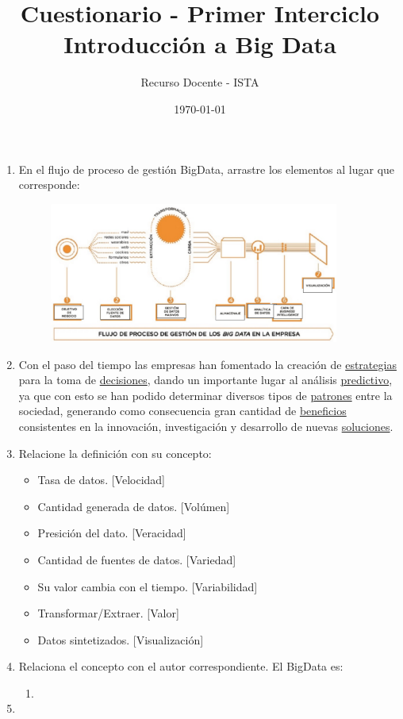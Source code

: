 \documentclass{article}
\title{Cuestionario - Primer Interciclo\\Introducción a Big Data}
\author{Recurso Docente - ISTA}
\date{\today}
\begin{document}
    \maketitle

    \begin{enumerate}
        \item En el flujo de proceso de gestión BigData, arrastre los elementos al lugar que corresponde:
            \begin{figure}[!h]
                \centering
                \includegraphics[width=0.9\textwidth]{img/recurso-1.png} 
            \end{figure}
        
        \item Con el paso del tiempo las empresas han fomentado la creación de \underline{estrategias} para la toma de \underline{decisiones}, dando un importante lugar al análisis \underline{predictivo}, ya que con esto se han podido determinar diversos tipos de \underline{patrones} entre la sociedad, generando como consecuencia gran cantidad de \underline{beneficios} consistentes en la innovación, investigación y desarrollo de nuevas \underline{soluciones}.
        \item Relacione la definición con su concepto:
            \begin{itemize}
                \item Tasa de datos. [Velocidad]
                \item Cantidad generada de datos. [Volúmen]
                \item Presición del dato. [Veracidad]
                \item Cantidad de fuentes de datos. [Variedad]
                \item Su valor cambia con el tiempo. [Variabilidad]
                \item Transformar/Extraer. [Valor]
                \item Datos sintetizados. [Visualización]
            \end{itemize}
        
        \item Relaciona el concepto con el autor correspondiente. El BigData es:
            \begin{enumerate}
                \item 
            \end{enumerate}
        
        \item 
    \end{enumerate}
\end{document}
